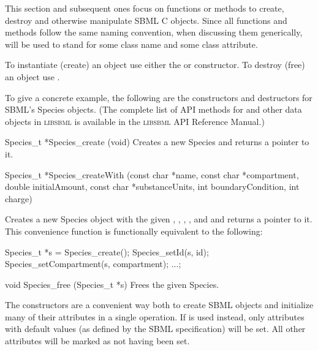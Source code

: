 \documentclass{sbmlmanual}
\newcommand{\libsbml}{\textsc{libsbml}}
\begin{document}
This section and subsequent ones focus on functions or methods to
create, destroy and otherwise manipulate SBML C objects.  Since all
functions and methods follow the same naming convention, when
discussing them generically,  will be used to stand for
some class name and  some class attribute.

To instantiate (create) an object use either the
 or  constructor.  To
destroy (free) an object use .

To give a concrete example, the following are the constructors and
destructors for SBML's Species objects.  (The complete list of API methods
for  and other data objects in \libsbml{} is available in
the \libsbml{} API Reference Manual.)


\begin{methoddef}{Species\_t *Species\_create (void)}
  Creates a new Species and returns a pointer to it.
\end{methoddef}

\begin{methoddef}{Species\_t *Species\_createWith (const char *name,
    const char *compartment,\\ double initialAmount, const char *substanceUnits,
    int boundaryCondition, int charge)}
  
  Creates a new Species object with the given ,
  , ,
  ,  and
   and returns a pointer to it.  This convenience function
  is functionally equivalent to the following:
  \begin{example}[c]
Species_t *s = Species_create();
Species_setId(s, id); Species_setCompartment(s, compartment); ...;
  \end{example}
\end{methoddef}

\begin{methoddef}{void Species\_free (Species\_t *s)}
  Frees the given Species.
\end{methoddef}


The  constructors are a convenient way both to
create SBML objects and initialize many of their attributes in a single
operation.  If  is used instead, only attributes with
default values (as defined by the SBML specification) will be set.  All
other attributes will be marked as not having been set.
\end{document}
